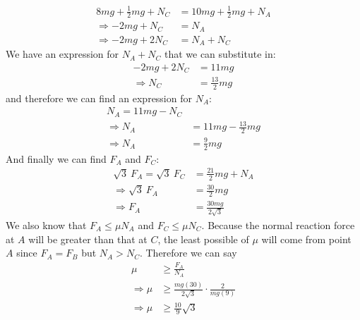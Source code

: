\begin{problem}[A1986FMIIQ3l]
{\begin{align*}
 8mg+\frac{1}{2}mg+N_C&=10mg+\frac{1}{2}mg+N_A \\
\Rightarrow -2mg+N_C&=N_A \\
\Rightarrow -2mg+2N_C&=N_A+N_C  
\end{align*}
We have an expression for $N_A+N_C$ that we can substitute in:
\begin{align*}
-2mg+2N_C&=11mg \\
\Rightarrow N_C&=\frac{13}{2}mg
\end{align*}
and therefore we can find an expression for $N_A$:
\begin{align*}
N_A=11mg-N_C \\
\Rightarrow N_A&=11mg-\frac{13}{2}mg \\
\Rightarrow N_A&=\frac{9}{2}mg
\end{align*}
And finally we can find $F_A$ and $F_C$:
\begin{align*}
\sqrt 3 \: F_A=\sqrt 3 \: F_C&=\frac{21}{2}mg+N_A \\
\Rightarrow \sqrt 3 \: F_A&=\frac{30}{2}mg\\
\Rightarrow F_A&=\frac{30mg}{2\sqrt3}
\end{align*}
We also know that $F_A\le\mu N_A$ and $F_C\le \mu N_C$. Because the normal reaction force at $A$ will be greater than that at $C$, the least possible of $\mu$ will come from point $A$ since $F_A=F_B$ but $N_A>N_C$. Therefore we can say 
\begin{align*}
\mu&\ge\frac{F_A}{N_A} \\
\Rightarrow \mu&\ge\frac{mg(30)}{2\sqrt 3}\cdot\frac{2}{mg(9)} \\
\Rightarrow \mu&\ge\frac{10}{9}\sqrt 3
\end{align*} 
}
\end{problem}